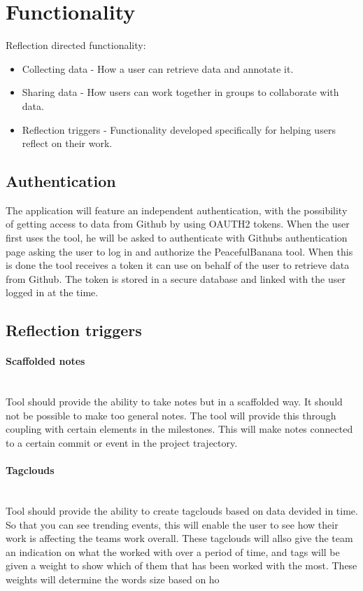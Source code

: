 \section{Functionality}

Reflection directed functionality:
\begin{itemize}
\item Collecting data - How a user can retrieve data and annotate it. 
\item Sharing data - How users can work together in groups to collaborate with data. 
\item Reflection triggers - Functionality developed specifically for helping users reflect on their work.
\end{itemize}

\subsection{Authentication}
The application will feature an independent authentication, with the possibility of getting access to data from Github by using OAUTH2 tokens. When the user first uses the tool, he will be asked to authenticate with Githubs authentication page asking the user to log in and authorize the PeacefulBanana tool. When this is done the tool receives a token it can use on behalf of the user to retrieve data from Github. The token is stored in a secure database and linked with the user logged in at the time. 

\subsection{Reflection triggers}
\paragraph{Scaffolded notes}\mbox{}\\
Tool should provide the ability to take notes but in a scaffolded way. It should not be possible to make too general notes. The tool will provide this through coupling with certain elements in the milestones. This will make notes connected to a certain commit or event in the project trajectory. 

\paragraph{Tagclouds}\mbox{}\\
Tool should provide the ability to create tagclouds based on data devided in time. So that you can see trending events, this will enable the user to see how their work is affecting the teams work overall. These tagclouds will allso give the team an indication on what the worked with over a period of time, and tags will be given a weight to show which of them that has been worked with the most. These weights will determine the words size based on ho

